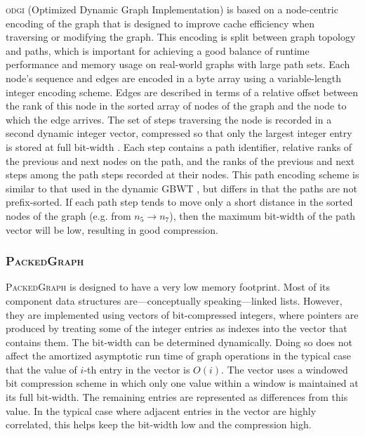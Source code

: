 \documentclass{bioinfo}
\begin{document}
\begin{methods}
\textsc{odgi} (Optimized Dynamic Graph Implementation) is based on a node-centric encoding of the graph that is designed to improve cache efficiency when traversing or modifying the graph.
This encoding is split between graph topology and paths, which is important for achieving a good balance of runtime performance and memory usage on real-world graphs with large path sets.
Each node's sequence and edges are encoded in a byte array using a variable-length integer encoding scheme.
Edges are described in terms of a relative offset between the rank of this node in the sorted array of nodes of the graph and the node to which the edge arrives.
The set of steps traversing the node is recorded in a second dynamic integer vector, compressed so that only the largest integer entry is stored at full bit-width \citep{prezza2017framework}.
Each step contains a path identifier, relative ranks of the previous and next nodes on the path, and the ranks of the previous and next steps among the path steps recorded at their nodes.
This path encoding scheme is similar to that used in the dynamic GBWT \citep{Siren_2019}, but differs in that the paths are not prefix-sorted.
If each path step tends to move only a short distance in the sorted nodes of the graph (e.g. from $n_{5} \to n_{7}$), then the maximum bit-width of the path vector will be low, resulting in good compression.

\subsubsection{\textsc{PackedGraph}}

\textsc{PackedGraph} is designed to have a very low memory footprint.
Most of its component data structures are---conceptually speaking---linked lists.
However, they are implemented using vectors of bit-compressed integers, where pointers are produced by treating some of the integer entries as indexes into the vector that contains them.
The bit-width can be determined dynamically.
Doing so does not affect the amortized asymptotic run time of graph operations in the typical case that the value of $i$-th entry in the vector is $O(i)$.
The vector uses a windowed bit compression scheme in which only one value within a window is maintained at its full bit-width.
The remaining entries are represented as differences from this value.
In the typical case where adjacent entries in the vector are highly correlated, this helps keep the bit-width low and the compression high.


\end{methods}
\end{document}
